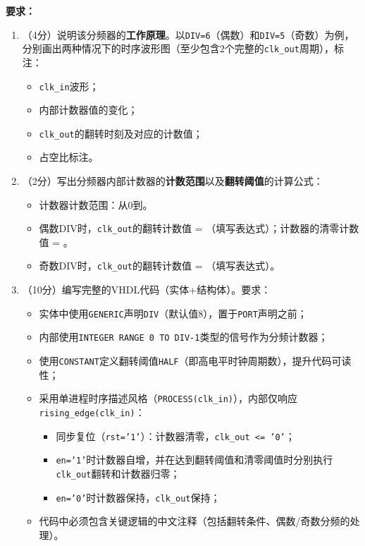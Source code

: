 \textbf{要求：}
\begin{enumerate}[label=(\arabic*)]
  \item （4分）说明该分频器的\textbf{工作原理}。以\texttt{DIV=6}（偶数）和\texttt{DIV=5}（奇数）为例，分别画出两种情况下的时序波形图（至少包含2个完整的\texttt{clk\_out}周期），标注：
  \begin{itemize}
    \item \texttt{clk\_in}波形；
    \item 内部计数器值的变化；
    \item \texttt{clk\_out}的翻转时刻及对应的计数值；
    \item 占空比标注。
  \end{itemize}

  \item （2分）写出分频器内部计数器的\textbf{计数范围}以及\textbf{翻转阈值}的计算公式：
  \begin{itemize}
    \item 计数器计数范围：从0到\underline{\hspace{2cm}}。
    \item 偶数DIV时，\texttt{clk\_out}的翻转计数值 = \underline{\hspace{2cm}}（填写表达式）；计数器的清零计数值 = \underline{\hspace{2cm}}。
    \item 奇数DIV时，\texttt{clk\_out}的翻转计数值 = \underline{\hspace{2cm}}（填写表达式）。
  \end{itemize}

  \item （10分）编写完整的VHDL代码（实体+结构体）。要求：
  \begin{itemize}
    \item 实体中使用\texttt{GENERIC}声明\texttt{DIV}（默认值8），置于\texttt{PORT}声明之前；
    \item 内部使用\texttt{INTEGER RANGE 0 TO DIV-1}类型的信号作为分频计数器；
    \item 使用\texttt{CONSTANT}定义翻转阈值\texttt{HALF}（即高电平时钟周期数），提升代码可读性；
    \item 采用单进程时序描述风格（\texttt{PROCESS(clk\_in)}），内部仅响应\texttt{rising\_edge(clk\_in)}：
    \begin{itemize}
      \item 同步复位（\texttt{rst='1'}）：计数器清零，\texttt{clk\_out <= '0'}；
      \item \texttt{en='1'}时计数器自增，并在达到翻转阈值和清零阈值时分别执行\texttt{clk\_out}翻转和计数器归零；
      \item \texttt{en='0'}时计数器保持，\texttt{clk\_out}保持；
    \end{itemize}
    \item 代码中必须包含关键逻辑的中文注释（包括翻转条件、偶数/奇数分频的处理）。
  \end{itemize}


\end{enumerate}

